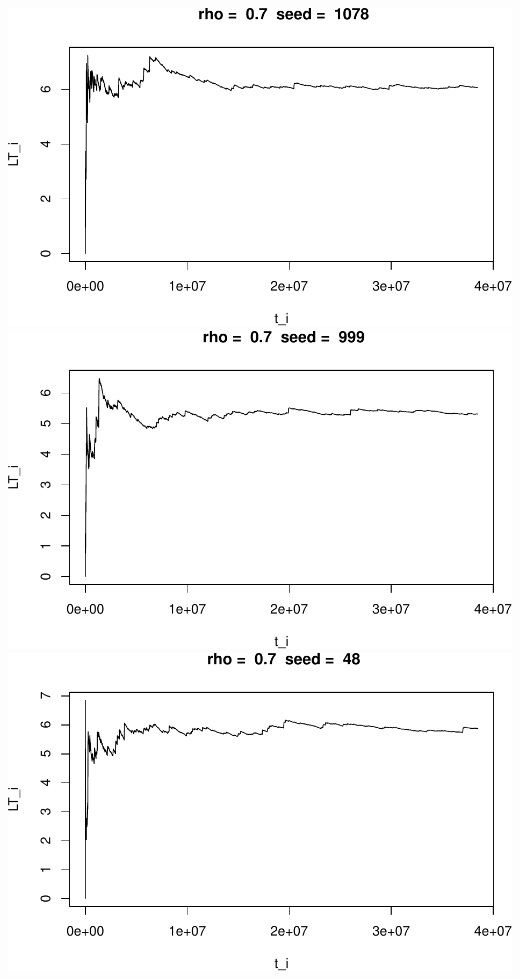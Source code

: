 \documentclass[]{article}
\begin{document}
\includegraphics{003_files/figure-latex/unnamed-chunk-17-4.pdf}
\includegraphics{003_files/figure-latex/unnamed-chunk-17-5.pdf}
\includegraphics{003_files/figure-latex/unnamed-chunk-17-6.pdf}
\end{document}
